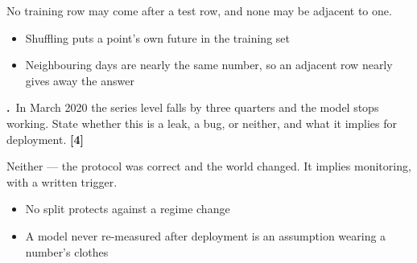 \documentclass[11pt,a4paper]{article}
\newcounter{exq}[section]
\newcommand{\question}[2]{%
  \refstepcounter{exq}%
  \medskip
  \noindent
  \begin{minipage}{\textwidth}
    \textbf{\theexq.}~#1 \hfill{\color{aimlmuted}\textbf{[#2]}}
  \end{minipage}\par}
\begin{document}
\begin{solution}[title={Solution}]
No training row may come after a test row, and none may be adjacent to one.
\begin{itemize}[leftmargin=*,nosep]
  \item Shuffling puts a point's own future in the training set
  \item Neighbouring days are nearly the same number, so an adjacent row nearly gives away the answer
\end{itemize}
\end{solution}
\question{In March 2020 the series level falls by three quarters and the model stops working. State whether this is a leak, a bug, or neither, and what it implies for deployment.}{4}
\begin{solution}[title={Solution}]
Neither --- the protocol was correct and the world changed. It implies monitoring, with a written trigger.
\begin{itemize}[leftmargin=*,nosep]
  \item No split protects against a regime change
  \item A model never re-measured after deployment is an assumption wearing a number's clothes
\end{itemize}
\end{solution}
\end{document}

